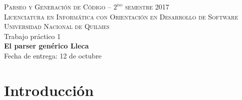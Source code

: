 \documentclass{article}
\newcommand{\lleca}{\textsf{Lleca}\xspace}
\begin{document}
\begin{center}
\textsc{{\small Parseo y Generaci\'on de C\'odigo -- $2^{\text{do}}$ semestre 2017}} \medskip \\ 
\textsc{{\small Licenciatura en Inform\'atica con Orientaci\'on en Desarrollo de Software}} \medskip \\
\textsc{{\small Universidad Nacional de Quilmes}} \medskip \\
{\Large Trabajo pr\'actico 1} \medskip \\
{\large {\bf El parser gen\'erico \lleca}} \medskip \\
\bigskip
Fecha de entrega: 12 de octubre
\end{center}

\tableofcontents

\section{Introducci\'on}
\end{document}
